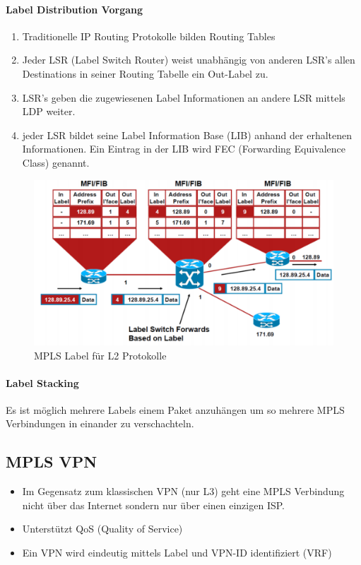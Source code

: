 \paragraph{Label Distribution Vorgang}
\begin{enumerate}
	\item Traditionelle IP Routing Protokolle bilden Routing Tables
	\item Jeder LSR (Label Switch Router) weist  unabhängig von anderen LSR's allen Destinations in seiner Routing Tabelle ein Out-Label zu. 
	\item LSR's geben die zugewiesenen Label Informationen an andere LSR mittels LDP weiter. 
	\item jeder LSR bildet seine Label Information Base (LIB) anhand der erhaltenen Informationen. Ein Eintrag in der LIB wird FEC (Forwarding Equivalence Class) genannt.
\end{enumerate}
\begin{figure}[h]
	\centering
	\includegraphics[width=0.7\linewidth]{images/mpls_ldp.pdf}
	\caption{MPLS Label für L2 Protokolle}
\end{figure}

\paragraph{Label Stacking}
Es ist möglich mehrere Labels einem Paket anzuhängen um so mehrere MPLS Verbindungen in einander zu verschachteln. 

\subsection{MPLS VPN}
\begin{itemize}
	\item Im Gegensatz zum klassischen VPN (nur L3) geht eine MPLS Verbindung nicht über das Internet sondern nur über einen einzigen ISP.
	\item Unterstützt QoS (Quality of Service)
	\item Ein VPN wird eindeutig mittels Label und VPN-ID identifiziert (VRF)
\end{itemize}

